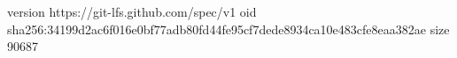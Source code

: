 version https://git-lfs.github.com/spec/v1
oid sha256:34199d2ac6f016e0bf77adb80fd44fe95cf7dede8934ca10e483cfe8eaa382ae
size 90687
